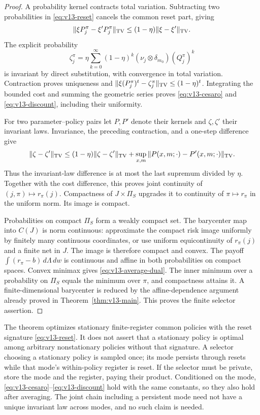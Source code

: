 \begin{proof}
A probability kernel contracts total variation. Subtracting two
probabilities in \eqref{eq:v13-reset} cancels the common reset part,
giving
\[
 \|\xi P_j^\pi-\xi'P_j^\pi\|_{\rm TV}
            \le(1-\eta)\|\xi-\xi'\|_{\rm TV}.
\]
The explicit probability
\begin{equation}\label{eq:v13-invariant}
 \zeta_j^\pi=\eta\sum_{k=0}^\infty(1-\eta)^k
             (\nu_j\otimes\delta_{m_0})(Q_j^\pi)^k
\end{equation}
is invariant by direct substitution, with convergence in total
variation. Contraction proves uniqueness and
$\|\xi(P_j^\pi)^t-\zeta_j^\pi\|_{\rm TV}\le(1-\eta)^t$.
Integrating the bounded cost and summing the geometric series proves
\eqref{eq:v13-cesaro} and \eqref{eq:v13-discount}, including their
uniformity.

For two parameter--policy pairs let $P,P'$ denote their kernels and
$\zeta,\zeta'$ their invariant laws. Invariance, the preceding
contraction, and a one-step difference give
\[
 \|\zeta-\zeta'\|_{\rm TV}
 \le(1-\eta)\|\zeta-\zeta'\|_{\rm TV}
              +\sup_{x,m}\|P(x,m;\cdot)-P'(x,m;\cdot)\|_{\rm TV}.
\]
Thus the invariant-law difference is at most the last supremum divided
by $\eta$. Together with the cost difference, this proves joint
continuity of $(j,\pi)\mapsto r_\pi(j)$. Compactness of $J\times\Pi_S$
upgrades it to continuity of $\pi\mapsto r_\pi$ in the uniform norm.
Its image is compact.

Probabilities on compact $\Pi_S$ form a weakly compact set. The
barycenter map into $C(J)$ is norm continuous: approximate the compact
risk image uniformly by finitely many continuous coordinates, or use
uniform equicontinuity of $r_\pi(j)$ and a finite net in $J$.
The image is therefore compact and convex. The payoff
$\int(r_\pi-b)\,d\Lambda\,dw$ is continuous and affine in both
probabilities on compact spaces. Convex minimax gives
\eqref{eq:v13-average-dual}. The inner minimum over a probability on
$\Pi_S$ equals the minimum over $\pi$, and compactness attains it.
A finite-dimensional barycenter is reduced by the affine-dependence
argument already proved in Theorem~\ref{thm:v13-main}. This proves the
finite selector assertion.
\end{proof}

\begin{remark}
The theorem optimizes stationary finite-register common policies with
the reset signature \eqref{eq:v13-reset}. It does not assert that a
stationary policy is optimal among arbitrary nonstationary policies
without that signature. A selector choosing a stationary policy is
sampled once; its mode persists through resets while that mode's
within-policy register is reset. If the selector must be private,
store the mode and the register, paying their product. Conditioned on
the mode, \eqref{eq:v13-cesaro}--\eqref{eq:v13-discount} hold with the
same constants, so they also hold after averaging. The joint chain
including a persistent mode need not have a unique invariant law
across modes, and no such claim is needed.
\end{remark}


